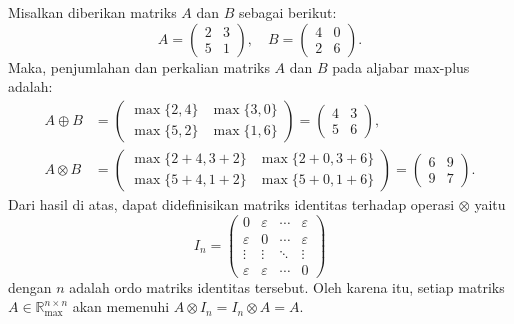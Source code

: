 \begin{contoh}
  Misalkan diberikan matriks $A$ dan $B$ sebagai berikut:
  \[
    A = \begin{pmatrix}
      2 & 3 \\
      5 & 1
    \end{pmatrix}, \quad
    B = \begin{pmatrix}
      4 & 0 \\
      2 & 6
    \end{pmatrix}.
  \]
  Maka, penjumlahan dan perkalian matriks $A$ dan $B$ pada aljabar max-plus adalah:
  \begin{align*}
    A \oplus B  & = \begin{pmatrix}
                      \max\{2, 4\} & \max\{3, 0\} \\
                      \max\{5, 2\} & \max\{1, 6\}
                    \end{pmatrix} = \begin{pmatrix}
                                      4 & 3 \\
                                      5 & 6
                                    \end{pmatrix},              \\
    A \otimes B & = \begin{pmatrix}
                      \max\{2 + 4, 3 + 2\} & \max\{2 + 0, 3 + 6\} \\
                      \max\{5 + 4, 1 + 2\} & \max\{5 + 0, 1 + 6\}
                    \end{pmatrix} = \begin{pmatrix}
                                      6 & 9 \\
                                      9 & 7
                                    \end{pmatrix}.
  \end{align*}
  Dari hasil di atas, dapat didefinisikan matriks identitas terhadap operasi $\otimes$ yaitu
  \[
    I_n =
    \begin{pmatrix}
      0           & \varepsilon & \cdots & \varepsilon \\
      \varepsilon & 0           & \cdots & \varepsilon \\
      \vdots      & \vdots      & \ddots & \vdots      \\
      \varepsilon & \varepsilon & \cdots & 0
    \end{pmatrix}
  \]
  dengan $n$ adalah ordo matriks identitas tersebut. Oleh karena itu, setiap matriks $A\in \mathbb{R}_{\max}^{n \times n}$ akan memenuhi $A \otimes I_n = I_n \otimes A = A$.
\end{contoh}

